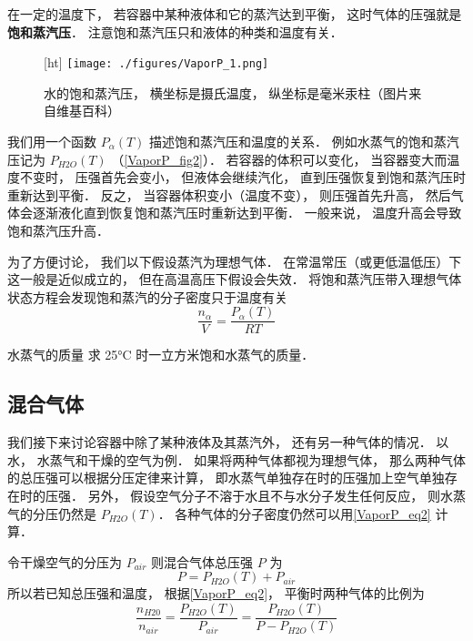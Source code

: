 

在一定的温度下， 若容器中某种液体和它的蒸汽达到平衡， 这时气体的压强就是\textbf{饱和蒸汽压}． 注意饱和蒸汽压只和液体的种类和温度有关．

\begin{figure}\label{VaporP_fig2}[ht]
\centering
\texttt{[image: ./figures/VaporP\_1.png]}
\caption{水的饱和蒸汽压， 横坐标是摄氏温度， 纵坐标是毫米汞柱（图片来自维基百科）} \label{VaporP_fig1}
\end{figure}

我们用一个函数 $P_\alpha(T)$ 描述饱和蒸汽压和温度的关系． 例如水蒸气的饱和蒸汽压记为 $P_{H2O}(T)$ （\autoref{VaporP_fig2}）． 若容器的体积可以变化， 当容器变大而温度不变时， 压强首先会变小， 但液体会继续汽化， 直到压强恢复到饱和蒸汽压时重新达到平衡． 反之， 当容器体积变小（温度不变）， 则压强首先升高，  然后气体会逐渐液化直到恢复饱和蒸汽压时重新达到平衡． 一般来说， 温度升高会导致饱和蒸汽压升高．

为了方便讨论， 我们以下假设蒸汽为理想气体． 在常温常压（或更低温低压）下这一般是近似成立的， 但在高温高压下假设会失效． 将饱和蒸汽压带入理想气体状态方程会发现饱和蒸汽的分子密度只于温度有关
\begin{equation}\label{VaporP_eq2}
\frac{n_\alpha}{V}  = \frac{P_\alpha(T)}{R T}
\end{equation}

\begin{exercise}{水蒸气的质量}
求 25°C 时一立方米饱和水蒸气的质量．
\end{exercise}

\subsection{混合气体}

我们接下来讨论容器中除了某种液体及其蒸汽外， 还有另一种气体的情况． 以水， 水蒸气和干燥的空气为例． 如果将两种气体都视为理想气体， 那么两种气体的总压强可以根据分压定律来计算， 即水蒸气单独存在时的压强加上空气单独存在时的压强． 另外， 假设空气分子不溶于水且不与水分子发生任何反应， 则水蒸气的分压仍然是 $P_{H2O}(T)$． 各种气体的分子密度仍然可以用\autoref{VaporP_eq2} 计算．

令干燥空气的分压为 $P_{air}$ 则混合气体总压强 $P$ 为
\begin{equation}
P = P_{H2O}(T) + P_{air}
\end{equation}
所以若已知总压强和温度， 根据\autoref{VaporP_eq2}， 平衡时两种气体的比例为
\begin{equation}\label{VaporP_eq1}
\frac{n_{H20}}{n_{air}} = \frac{P_{H2O}(T)}{P_{air}} = \frac{P_{H2O}(T)}{P - P_{H2O}(T)}
\end{equation}

